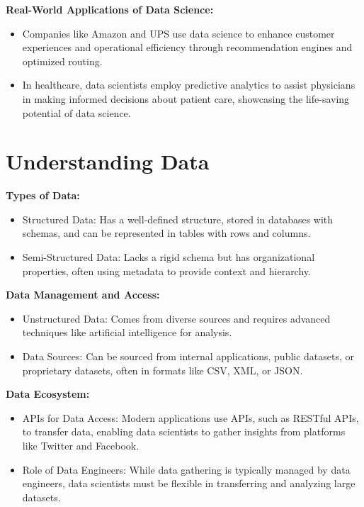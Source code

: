 \documentclass[12pt]{report} %
\begin{document}
		\noindent \textbf{Real-World Applications of Data Science:}
		\begin{itemize}
			\item Companies like Amazon and UPS use data science to enhance customer experiences and operational efficiency through recommendation engines and optimized routing.
			\item In healthcare, data scientists employ predictive analytics to assist physicians in making informed decisions about patient care, showcasing the life-saving potential of data science.
		\end{itemize}
	
	\section{Understanding Data}
		
		\noindent \textbf{Types of Data:}
		\begin{itemize}
			\item Structured Data: Has a well-defined structure, stored in databases with schemas, and can be represented in tables with rows and columns.
			\item Semi-Structured Data: Lacks a rigid schema but has organizational properties, often using metadata to provide context and hierarchy.
		\end{itemize}
		
		\noindent \textbf{Data Management and Access:}
		\begin{itemize}
			\item Unstructured Data: Comes from diverse sources and requires advanced techniques like artificial intelligence for analysis.
			\item Data Sources: Can be sourced from internal applications, public datasets, or proprietary datasets, often in formats like CSV, XML, or JSON.
		\end{itemize}
		
	\noindent \textbf{Data Ecosystem:}
		\begin{itemize}
		\item APIs for Data Access: Modern applications use APIs, such as RESTful APIs, to transfer data, enabling data scientists to gather insights from platforms like Twitter and Facebook.
		\item Role of Data Engineers: While data gathering is typically managed by data engineers, data scientists must be flexible in transferring and analyzing large datasets.
	\end{itemize}
		
\end{document}
